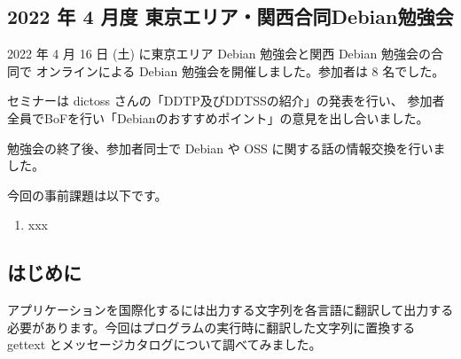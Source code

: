 \documentclass[mingoth,a4paper]{jsarticle}
\begin{document}

\subsection{2022 年 4 月度 東京エリア・関西合同Debian勉強会}

2022 年 4 月 16 日 (土) に東京エリア Debian 勉強会と関西 Debian 勉強会の合同で
オンラインによる Debian 勉強会を開催しました。参加者は 8 名でした。

セミナーは dictoss さんの「DDTP及びDDTSSの紹介」の発表を行い、
参加者全員でBoFを行い「Debianのおすすめポイント」の意見を出し合いました。

勉強会の終了後、参加者同士で Debian や OSS に関する話の情報交換を行いました。



今回の事前課題は以下です。

\begin{enumerate}
  \item xxx
\end{enumerate}


\begin{multicols}{2}
{\small

}
\end{multicols}

%
%
%
%




\subsection{はじめに}

アプリケーションを国際化するには出力する文字列を各言語に翻訳して出力する必要があります。今回はプログラムの実行時に翻訳した文字列に置換する gettext とメッセージカタログについて調べてみました。
\end{document}
